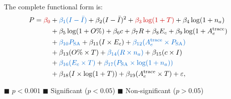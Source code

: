 The complete functional form is:
\begin{align}
P = \textcolor{critterm}{\beta_0} &+ \textcolor{sigterm}{\beta_1 (I - \bar{I})} + \beta_2 (I - \bar{I})^2 + \textcolor{critterm}{\beta_3 \log(1+T)} + \beta_4 \log(1+n_a) \nonumber \\
&+ \beta_5 \log(1+O\%) + \beta_6 c + \beta_7 R + \beta_8 E_c + \beta_9 \log(1+A_e^{\text{trace}}) \nonumber \\
&+ \textcolor{sigterm}{\beta_{10} P_{\text{SA}}} + \beta_{11} (I \times E_c) + \textcolor{sigterm}{\beta_{12} (A_e^{\text{trace}} \times P_{\text{SA}})} \nonumber \\
&+ \beta_{13} (O\% \times T) + \textcolor{sigterm}{\beta_{14} (R \times n_a)} + \beta_{15} (c \times I) \nonumber \\
&+ \textcolor{sigterm}{\beta_{16} (E_c \times T)} + \textcolor{sigterm}{\beta_{17} (P_{\text{SA}} \times \log(1+n_a))} \nonumber \\
&+ \beta_{18} (I \times \log(1+T)) + \beta_{19} (A_e^{\text{trace}} \times T) + \varepsilon,
\label{eq:scaling_law}
\end{align}

\begin{center}
{\small \textcolor{critterm}{$\blacksquare$} $p < 0.001$ \quad \textcolor{sigterm}{$\blacksquare$} Significant ($p < 0.05$) \quad $\blacksquare$ Non-significant ($p > 0.05$)}
\end{center}

